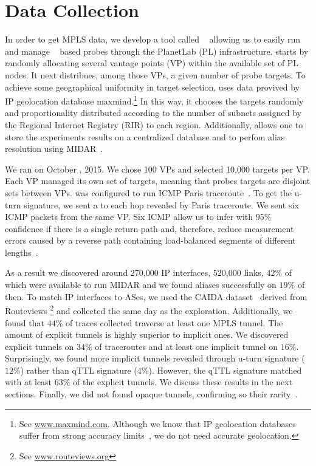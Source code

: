 \section{Data Collection}\label{dataset}
In order to get MPLS data, we develop a tool called
\magallanes~\cite{magallanes}  allowing
us to easily run and manage \scamper~\cite{Luckie10} based probes through the
PlanetLab (PL) infrastructure.  \magallanes starts by randomly allocating
several vantage points (VP) within the available set of PL nodes.  It next
distribues, among those VPs, a given number of probe targets.
To achieve some geographical uniformity in target selection, \magallanes uses
data provived by IP geolocation database maxmind.\footnote{See
\url{www.maxmind.com}.  Although we know that IP geolocation databases suffer
from strong accuracy limits~\cite{geolocation}, we do not need accurate geolocation.}  In this way, it chooses the
targets randomly and proportionality distributed according to the number of
subnets assigned by the Regional Internet Registry (RIR) to each region.
Additionally, \magallanes allows one to store the experiments results on a
centralized database and to perfom alias resolution using MIDAR~\cite{Keys13}.

We ran \magallanes on October , 2015.  We chose 100 VPs and selected
10,000 targets per VP.  Each VP managed its own set of targets, meaning that
probes targets are disjoint sets between VPs.  \scamper was configured to run
ICMP Paris traceroute~\cite{BRICE06}.  To get the u-turn signature,
we sent a \ping to each hop revealed by Paris traceroute. We sent six
ICMP \echorequest packets from the same VP.  Six ICMP \echoreply allow us to
infer with $95\%$ confidence if there is a single return path and, 
therefore, reduce measurement errors caused by a reverse path containing
load-balanced segments of different lengths~\cite{BRICE07}. 

As a result we discovered around 270,000 IP interfaces,  520,000 links, $42\%$
of which were available to run MIDAR and we found aliases successfully on $19\%$
of then. To match IP interfaces to ASes, we used the CAIDA
dataset~\cite{caida_ref} derived from Routeviews \footnote{See
\url{www.routeviews.org}} and collected the same day as the exploration.
Additionally, we found that $44\%$ of traces collected traverse at least one
MPLS tunnel.  The amount of explicit tunnels is highly superior to implicit
ones. We discovered explicit tunnels on $34\%$ of traceroutes and at least one
implicit tunnel on $16\%$. Surprisingly, we found more implicit tunnels revealed
through u-turn signature ($12\%$) rather than qTTL signature
($4\%$). However, the qTTL signature matched with at least $63\%$ of
the explicit tunnels. We discuss these results in the next sections. Finally, we
did not found opaque tunnels, confirming so their rarity~\cite{VAN2013}.
